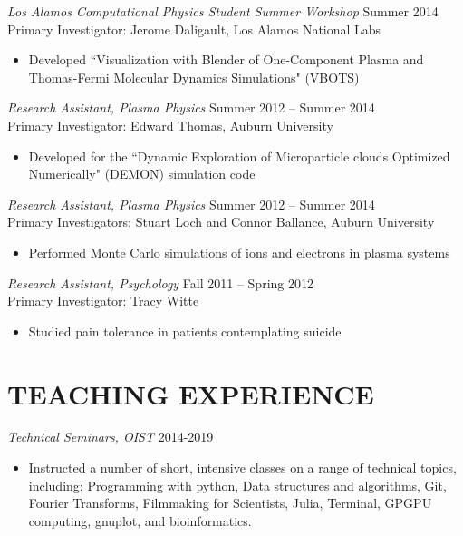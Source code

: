 \documentclass[margin, 10pt, a4paper]{res} %
\begin{document}
\begin{resume}
{\sl Los Alamos Computational Physics Student Summer Workshop} \hfill Summer 2014 \\
Primary Investigator: Jerome Daligault, Los Alamos National Labs
\begin{itemize}[label = {}] \itemsep -2pt %
\item Developed ``Visualization with Blender of One-Component Plasma and Thomas-Fermi Molecular Dynamics Simulations" (VBOTS)
\end{itemize}

{\sl Research Assistant, Plasma Physics} \hfill Summer 2012 -- Summer 2014 \\
Primary Investigator: Edward Thomas, Auburn University

\begin{itemize}[label = {}] \itemsep -2pt %
\item Developed for the ``Dynamic Exploration of Microparticle clouds Optimized Numerically" (DEMON) simulation code
\end{itemize}

{\sl Research Assistant, Plasma Physics} \hfill Summer 2012 -- Summer 2014\\
Primary Investigators: Stuart Loch and Connor Ballance, Auburn University
\begin{itemize} [label = {}]
\item Performed Monte Carlo simulations of ions and electrons in plasma systems
\end{itemize} 

{\sl Research Assistant, Psychology} \hfill Fall 2011 -- Spring 2012\\
Primary Investigator: Tracy Witte

\begin{itemize} [label = {}]
\item Studied pain tolerance in patients contemplating suicide
\end{itemize} 


\section{TEACHING EXPERIENCE}

{\sl Technical Seminars, OIST} \hfill{2014-2019}
\begin{itemize}[label = {}]
\item Instructed a number of short, intensive classes on a range of technical topics, including: Programming with python, Data structures and algorithms, Git, Fourier Transforms, Filmmaking for Scientists, Julia, Terminal, GPGPU computing, gnuplot, and bioinformatics.
\end{itemize}


\end{resume}
\end{document}
